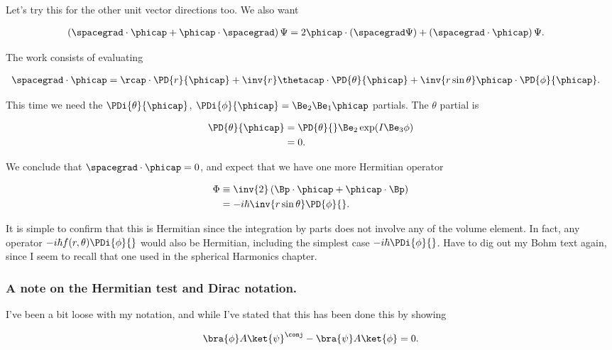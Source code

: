 Let's try this for the other unit vector directions too.  We also want

\begin{align*}
\left( \spacegrad \cdot \phicap + \phicap \cdot \spacegrad \right) \Psi
&=
2 \phicap \cdot (\spacegrad \Psi) + \left( \spacegrad \cdot \phicap \right) \Psi.
\end{align*}

The work consists of evaluating

\begin{align*}
\spacegrad \cdot \phicap 
&= \rcap \cdot \PD{r}{\phicap}
+ \inv{r} \thetacap \cdot \PD{\theta}{\phicap}
+ \inv{r \sin\theta} \phicap \cdot \PD{\phi}{\phicap}.
\end{align*}

This time we need the $\PDi{\theta}{\phicap}$, $\PDi{\phi}{\phicap} = \Be_2 \Be_1 \phicap$ partials.  The $\theta$ partial is

\begin{align*}
\PD{\theta}{\phicap} 
&=
\PD{\theta}{} \Be_2 \exp( I \Be_3 \phi ) \\
&= 0.
\end{align*}

We conclude that $\spacegrad \cdot \phicap = 0$, and expect that we have one more Hermitian operator

\begin{align*}
\Phi &\equiv \inv{2} \left( \Bp \cdot \phicap + \phicap \cdot \Bp \right)  \\
&=
-i \hbar \inv{r \sin\theta} \PD{\phi}{}.
\end{align*}

It is simple to confirm that this is Hermitian since the integration by parts does not involve any of the volume element.  In fact, any operator $-i\hbar f(r,\theta) \PDi{\phi}{}$ would also be Hermitian, including the simplest case $-i\hbar \PDi{\phi}{}$.  Have to dig out my Bohm text again, since I seem to recall that one used in the spherical Harmonics chapter.

\subsubsection{A note on the Hermitian test and Dirac notation.}

I've been a bit loose with my notation, and while I've stated that this has been done this by showing

\begin{align*}
\bra{\phi} A \ket{\psi}^\conj - \bra{\psi} A \ket{\phi} = 0.
\end{align*}

